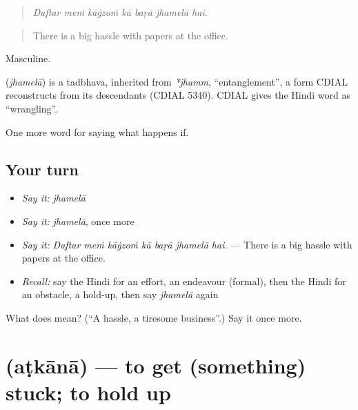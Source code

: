 \begin{quote}
      
\end{quote}

\begin{quote}
\emph{Daftar meṁ kāġzoṁ kā baṛā jhamelā hai.}
\end{quote}

\begin{quote}
There is a big hassle with papers at the office.
\end{quote}

Masculine.

\begin{cousinweb}
\textbf{} (\emph{jhamelā}) is a tadbhava, inherited from \emph{*jhamm}, \textquotedblleft{}entanglement\textquotedblright{}, a form CDIAL reconstructs from its descendants (CDIAL 5340). CDIAL gives the Hindi word as \textquotedblleft{}wrangling\textquotedblright{}.
\end{cousinweb}

\begin{grammarlens}[title={What you've built}]
One more word for saying what happens if.
\end{grammarlens}

\subsection*{Your turn}
\begin{itemize}
\raggedright
  \item \emph{Say it:} \emph{jhamelā}
  \item \emph{Say it:} \emph{jhamelā}, once more
  \item \emph{Say it:} \emph{Daftar meṁ kāġzoṁ kā baṛā jhamelā hai.} — There is a big hassle with papers at the office.
  \item \emph{Recall:} say the Hindi for an effort, an endeavour (formal), then the Hindi for an obstacle, a hold-up, then say \emph{jhamelā} again
\end{itemize}

\begin{tcolorbox}[breakable,colback=teal!4,colframe=teal!35!black,title={Before you move on}]
What does  mean? (\textquotedblleft{}A hassle, a tiresome business\textquotedblright{}.) Say it once more.
\end{tcolorbox}
\section[\texorpdfstring{\hi{अटकाना} (aṭkānā)}{अटकाना (aṭkānā)}]{ (aṭkānā) — to get (something) stuck; to hold up}

